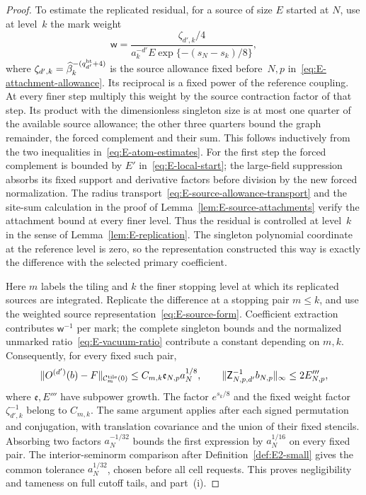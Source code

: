 \begin{proof}
To estimate the replicated residual, for a source of size $E$ started at $N$, use at level~$k$ the mark weight
\begin{equation*}
 \mathsf w=\frac{\zeta_{d',k}/4}{a_k^{-d'}E\exp\{-(s_N-s_k)/8\}},
\end{equation*}
where $\zeta_{d',k}=\widehat\beta_k^{-(q^{\rm ht}_{d'}+4)}$ is the source allowance fixed before~$N,p$ in~\eqref{eq:E-attachment-allowance}. Its reciprocal is a fixed power of the reference coupling. At every finer step multiply this weight by the source contraction factor of that step. Its product with the dimensionless singleton size is at most one quarter of the available source allowance; the other three quarters bound the graph remainder, the forced complement and their sum. This follows inductively from the two inequalities in~\eqref{eq:E-atom-estimates}. For the first step the forced complement is bounded by $E'$ in~\eqref{eq:E-local-start}; the large-field suppression absorbs its fixed support and derivative factors before division by the new forced normalization. The radius transport~\eqref{eq:E-source-allowance-transport} and the site-sum calculation in the proof of Lemma~\ref{lem:E-source-attachments} verify the attachment bound at every finer level. Thus the residual is controlled at level~$k$ in the sense of Lemma~\ref{lem:E-replication}. The singleton polynomial coordinate at the reference level is zero, so the representation constructed this way is exactly the difference with the selected primary coefficient.

Here $m$ labels the tiling and $k$ the finer stopping level at which its replicated sources are integrated. Replicate the difference at a stopping pair $m\le k$, and use the weighted source representation~\eqref{eq:E-source-form}. Coefficient extraction contributes $\mathsf w^{-1}$ per mark; the complete singleton bounds and the normalized unmarked ratio~\eqref{eq:E-vacuum-ratio} contribute a constant depending on $m,k$. Consequently, for every fixed such pair,
\begin{equation}\label{eq:E-local-error}
 \|O^{(d')}(b)-F\|_{\mathcal C^{\rm tile}_m(0)}
 \le C_{m,k}\mathfrak e_{N,p}a_N^{1/8},\qquad
 \|\mathsf Z_{N,p,d'}^{-1}b_{N,p}\|_\infty\le2E'''_{N,p},
\end{equation}
where $\mathfrak e,E'''$ have subpower growth. The factor $e^{s_k/8}$ and the fixed weight factor $\zeta_{d',k}^{-1}$ belong to $C_{m,k}$. The same argument applies after each signed permutation and conjugation, with translation covariance and the union of their fixed stencils. Absorbing two factors $a_N^{-1/32}$ bounds the first expression by $a_N^{1/16}$ on every fixed pair. The interior-seminorm comparison after Definition~\ref{def:E2-small} gives the common tolerance $a_N^{1/32}$, chosen before all cell requests. This proves negligibility and tameness on full cutoff tails, and part~(i).


\end{proof}
